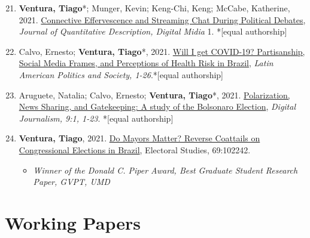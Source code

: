 \documentclass[letterpaper, 11pt]{article}
\newenvironment{benumerate}[1]{
    \let\oldItem\item
    \def\item{\addtocounter{enumi}{-2}\oldItem}
    \begin{enumerate}[leftmargin=2em]
    \setcounter{enumi}{#1}
    \addtocounter{enumi}{1}
}{
    \end{enumerate}
}
\begin{document}
\begin{benumerate}{20}
        \item \textbf{Ventura, Tiago}*;  Munger, Kevin; Keng-Chi, Keng; McCabe, Katherine, 2021. \href{https://journalqd.org/article/view/2573}{Connective Effervescence and Streaming Chat
        During Political Debates}, \textit{Journal of Quantitative Description, Digital Midia} 1. *[equal authorship]

        \item  Calvo, Ernesto; \textbf{Ventura, Tiago}*, 2021. \href{http://venturatiago.com/files/Calvo_Ventura_Covid_Social_Media.pdf}{Will I get COVID-19? Partisanship, Social Media Frames, and Perceptions of Health Risk in Brazil}, \textit{Latin American Politics and Society, 1-26}.*[equal authorship]

        \item  Aruguete, Natalia; Calvo, Ernesto; \textbf{Ventura, Tiago}*, 2021. \href{https://www.tandfonline.com/doi/abs/10.1080/21670811.2020.1852094}{Polarization, News Sharing, and Gatekeeping: A study of the Bolsonaro Election}, \textit{Digital Journalism, 9:1, 1-23}. *[equal authorship]

        \item \textbf{Ventura, Tiago}, 2021. \href{https://www.sciencedirect.com/science/article/pii/S0261379420301219?dgcid=author}{Do Mayors Matter? Reverse Coattails on Congressional Elections in Brazil}, Electoral Studies, 69:102242.
            \begin{itemize}[leftmargin=*]
            \item \textit{Winner of the Donald C. Piper Award, Best Graduate Student Research Paper, GVPT, UMD}
            \end{itemize}


    \end{benumerate}


\section*{Working Papers}
\end{document}
